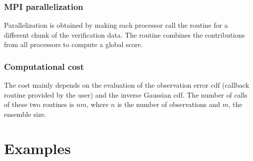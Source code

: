 \documentclass[11pt]{article}
\begin{document}
\subsubsection*{MPI parallelization}

Parallelization is obtained by making each processor call the routine
for a different chunk of the verification data.
The routine combines the contributions from all processors
to compute a global score.

\subsubsection*{Computational cost}

The cost mainly depends on the evaluation of the observation error cdf
(callback routine provided by the user) and the inverse Gaussian cdf.
The number of calls of these two routines is $n m$,
where $n$ is the number of observations and $m$, the ensemble size.

\clearpage

\section{Examples}
\end{document}
